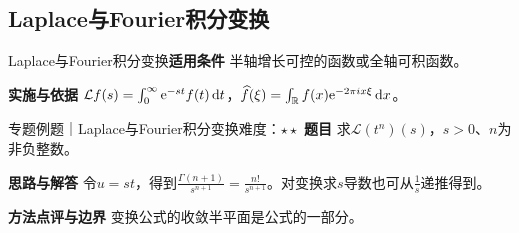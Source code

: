 \subsection{Laplace与Fourier积分变换}\label{mat:special_integrals:laplace}
\begin{method}{Laplace与Fourier积分变换}\textbf{适用条件} 半轴增长可控的函数或全轴可积函数。\par\textbf{实施与依据} $\mathcal Lf(s)=\int_0^\infty\mathrm{e}^{-st}f(t)\mathop{}\!\mathrm{d} t$，$\widehat f(\xi)=\int_{\mathbb{R}} f(x)\mathrm{e}^{-2\pi i x\xi}\mathop{}\!\mathrm{d} x$。\end{method}
\begin{example}{专题例题｜Laplace与Fourier积分变换}{难度：$\star\star$}
\textbf{题目} 求$\mathcal L(t^n)(s)$，$s>0$、$n$为非负整数。\par\textbf{思路与解答} 令$u=st$，得到$\frac{\Gamma(n+1)}{s^{n+1}}=\frac{n!}{s^{n+1}}$。对变换求$s$导数也可从$\frac{1}{s}$递推得到。\par\textbf{方法点评与边界} 变换公式的收敛半平面是公式的一部分。
\end{example}
